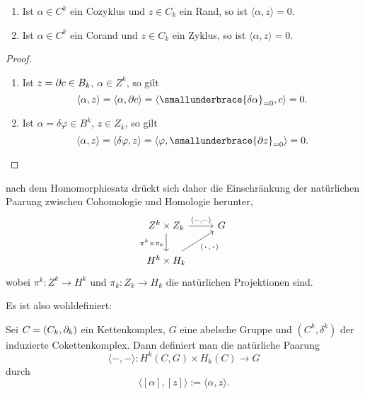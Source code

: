\begin{bemerkung}
  \begin{enumerate}
    \item
      Ist $\alpha \in C^k$ ein Cozyklus und $z \in C_k$ ein Rand, so ist $\langle \alpha, z \rangle = 0$.
    \item
      Ist $\alpha \in C^k$ ein Corand und $z \in C_k$ ein Zyklus, so ist $\langle \alpha, z \rangle = 0$.
  \end{enumerate}
\end{bemerkung}
\begin{proof}
  \begin{enumerate}
    \item
      Ist $z = \partial c \in B_k$, $\alpha \in Z^k$, so gilt
      \begin{equation*}
        \langle \alpha,z \rangle = \langle \alpha, \del c \rangle = \langle \smallunderbrace{\delta\alpha}_{=0}, c \rangle = 0.
      \end{equation*}
    \item
      Ist $\alpha = \delta \varphi \in B^k$, $z \in Z_k$, so gilt
      \begin{equation*}
        \langle \alpha,z \rangle = \langle \delta\varphi, z \rangle = \langle \varphi, \smallunderbrace{\del z}_{=0} \rangle = 0.
      \end{equation*}
  \end{enumerate}
\end{proof}
\begin{kommentar}
  nach dem Homomorphiesatz drückt sich daher die Einschränkung der natürlichen Paarung zwischen Cohomologie und Homologie herunter,
  \begin{equation*}
    \begin{tikzcd}
      Z^k \times Z_k  \arrow[swap]{d}{\pi^k \times \pi_k}
                      \arrow{r}{\langle -,- \rangle} & G \\
      H^k \times H_k \arrow[swap]{ur}{\langle \,\boldsymbol\cdot\,,\,\boldsymbol\cdot\, \rangle}
    \end{tikzcd}
  \end{equation*}
  wobei $\pi^k \colon Z^k \to H^k$ und $\pi_k \colon Z_k \to H_k$ die natürlichen Projektionen sind.
\end{kommentar}
Es ist also wohldefiniert:
\begin{defn}
  Sei $C = (C_k,\partial_k)$ ein Kettenkomplex, $G$ eine abelsche Gruppe und $(C^k,\delta^k)$ der induzierte Cokettenkomplex.
  Dann definiert man die natürliche Paarung
  \begin{equation*}
    \langle - , - \rangle\colon H^k(C,G) \times H_k(C) \to G
  \end{equation*}
  durch
  \begin{equation*}
    \langle [\alpha], [z] \rangle := \langle \alpha, z \rangle.
  \end{equation*}
\end{defn}

